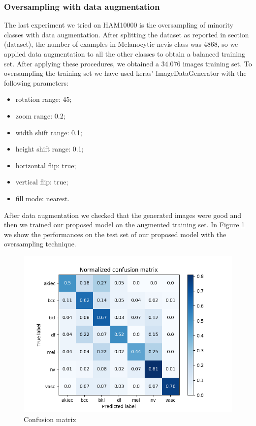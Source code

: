 	\subsubsection{Oversampling with data augmentation}
	
		The last experiment we tried on HAM10000 is the oversampling of minority classes with data augmentation. After splitting the dataset as reported in section (dataset), the number of examples in Melanocytic nevis class was 4868, so we applied data augmentation to all the other classes to obtain a balanced training set. After applying these procedures, we obtained a 34.076 images training set.
		To oversampling the training set we have used keras’ ImageDataGenerator with the following parameters:
		\begin{itemize}
			\item rotation range: 45; 
			\item zoom range: 0.2; 
			\item width shift range: 0.1;
			\item height shift range: 0.1;
			\item horizontal flip: true; 
			\item vertical flip: true;
			\item fill mode: nearest.
		\end{itemize}
		
		After data augmentation we checked that the generated images were good and then we trained our proposed model on the augmented training set.
		In Figure \ref{fig:third-matrix} we show the performances on the test set of our proposed model with the oversampling technique.
		
		\begin{figure}[H]
			\centering
			\includegraphics[width=15cm]{images/thirdMatrix.png}
			\caption{Confusion matrix}
			\label{fig:third-matrix}
		\end{figure}
		
